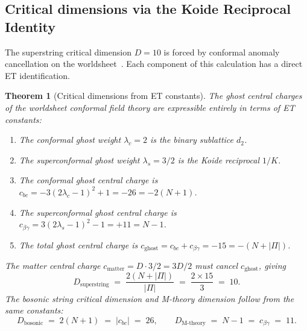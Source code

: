 \documentclass[11pt,a4paper]{article}
\newtheorem{theorem}{Theorem}[section]
\theoremstyle{definition}
\theoremstyle{remark}
\begin{document}
\subsection{Critical dimensions via the Koide Reciprocal Identity}\label{subsec:critical-ghost}

The superstring critical dimension $D = 10$ is forced by conformal anomaly cancellation on the worldsheet~\cite{MiaoLi}. Each component of this calculation has a direct ET identification.

\begin{theorem}[Critical dimensions from ET constants]\label{thm:critical-dims}
The ghost central charges of the worldsheet conformal field theory are expressible entirely in terms of ET constants:
\begin{enumerate}[label=\textnormal{(\roman*)},leftmargin=*]
\item The conformal ghost weight $\lambda_{c} = 2$ is the binary sublattice $d_{2}$.
\item The superconformal ghost weight $\lambda_{s} = 3/2$ is the Koide reciprocal $1/K$.
\item The conformal ghost central charge is $c_{bc} = -3(2\lambda_{c}-1)^{2}+1 = -26 = -2(N+1)$.
\item The superconformal ghost central charge is $c_{\beta\gamma} = 3(2\lambda_{s}-1)^{2}-1 = +11 = N-1$.
\item The total ghost central charge is $c_{\mathrm{ghost}} = c_{bc} + c_{\beta\gamma} = -15 = -(N+|\Pi|)$.
\end{enumerate}
The matter central charge $c_{\mathrm{matter}} = D \cdot 3/2 = 3D/2$ must cancel $c_{\mathrm{ghost}}$, giving
\begin{equation}\label{eq:D-super}
\boxed{\;D_{\mathrm{superstring}} \;=\; \frac{2(N + |\Pi|)}{|\Pi|} \;=\; \frac{2 \times 15}{3} \;=\; 10.\;}
\end{equation}
The bosonic string critical dimension and M-theory dimension follow from the same constants:
\begin{equation}\label{eq:D-bos-M}
D_{\mathrm{bosonic}} \;=\; 2(N+1) \;=\; |c_{bc}| \;=\; 26, \qquad D_{\mathrm{M\text{-}theory}} \;=\; N - 1 \;=\; c_{\beta\gamma} \;=\; 11.
\end{equation}
\end{theorem}
\end{document}
